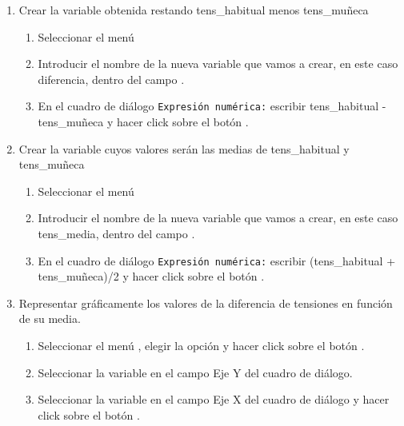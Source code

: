 \begin{enumerate}[leftmargin=*]
\begin{enumerate}
\item Crear la variable  obtenida restando \textsf{tens\_habitual} menos  \textsf{tens\_muñeca}
\begin{indicacion}
\begin{enumerate}
\item Seleccionar el menú 
\item Introducir el nombre de la nueva variable que vamos a crear, en este caso \textsf{diferencia}, dentro del campo .
\item En el cuadro de diálogo \texttt{Expresión numérica:} escribir \textsf{tens\_habitual} - \textsf{tens\_muñeca} y hacer click sobre el
botón .
\end{enumerate}
\end{indicacion}

\item Crear la variable  cuyos valores serán las medias de \textsf{tens\_habitual} y  \textsf{tens\_muñeca}
\begin{indicacion}
\begin{enumerate}

\item Seleccionar el menú 
\item Introducir el nombre de la nueva variable que vamos a crear, en este caso \textsf{tens\_media}, dentro del campo .
\item En el cuadro de diálogo \texttt{Expresión numérica:} escribir (\textsf{tens\_habitual} + \textsf{tens\_muñeca})/2 y hacer click sobre
el botón .
\end{enumerate}
\end{indicacion}

\item Representar gráficamente los valores de la diferencia de tensiones en función de su media.
\begin{indicacion}
\begin{enumerate}
\item Seleccionar el menú , elegir la opción  y hacer click sobre el botón .
\item Seleccionar la variable  en el campo Eje Y del cuadro de diálogo.
\item Seleccionar la variable  en el campo Eje X del cuadro de diálogo y hacer click sobre el botón .
\end{enumerate}
\end{indicacion}


\end{enumerate}
\end{enumerate}
